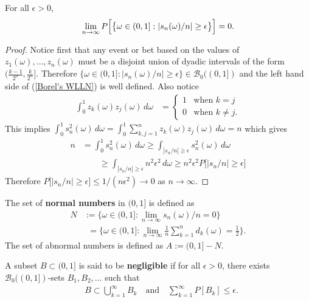 \begin{theorem}[{\bf WLLN}]
For all $\epsilon>0$,
\begin{equation}
\label{Borel's WLLN}
\lim_{n\rightarrow \infty}P\Bigl[\bigl\{\omega\in (0,1]: \left|{s_n(\omega)}/n \right|\geq\epsilon \bigr\} \Bigr] =0.
\end{equation}
\end{theorem}
\begin{proof}
Notice first that any event or bet based on the values of $z_1(\omega), \ldots, z_n(\omega)$ must be a disjoint union of dyadic intervals of the form $(\frac{k-1}{2^n}, \frac{k}{2^n}]$. Therefore $\bigl\{\omega\in (0,1]: \left|{s_n(\omega)}/n \right| \geq \epsilon \bigr\} \in \mathcal B_0((0,1])$ and the left hand side of (\ref{Borel's WLLN}) is well defined. Also notice
\begin{align*}
\int_0^1 z_k(\omega)z_j(\omega)\, d\omega
& = \begin{cases}
1 & \text{when $k=j$}\\
0 & \text{when $k\neq j$}.
\end{cases}
\end{align*}
This implies $\int_0^1 s^2_n(\omega)\, d\omega = \int_0^1 \sum_{k,j=1}^n z_k(\omega)z_j(\omega) \,d\omega = n$ which gives
\begin{align*}
n  &= \int_0^1 s^2_n(\omega)\, d\omega  \geq \int_{|s_n/n|\geq \epsilon} s^2_n(\omega)\, d\omega \\
& \qquad \geq \int_{|s_n/n|\geq \epsilon} n^2\epsilon^2\, d\omega  \geq n^2\epsilon^2 P\bigl[|s_n/n|\geq \epsilon\bigr]
\end{align*}
Therefore $P\bigl[|s_n/n|\geq \epsilon\bigr]\leq 1/(n\epsilon^2)\rightarrow 0$ as $n\rightarrow \infty$.
\end{proof}

\begin{definition}
The set of {\bf normal numbers} in $(0,1]$ is defined as
\begin{align*}
N
&:=\{\omega\in(0,1]: \lim_{n\rightarrow \infty} {s_n(\omega)}/n =0\}\\
&\phantom{:}=\{\omega\in(0,1]: \lim_{n\rightarrow \infty} \textstyle\frac{1}{n}\textstyle\sum_{k=1}^n d_k(\omega) = \textstyle\frac{1}{2}\}.
\end{align*}
The set of abnormal numbers is defined as $A:=(0,1]-N$.
\end{definition}


\begin{definition}
A subset $B\subset (0,1]$ is said to be {\bf negligible} if for all $\epsilon>0$, there exists $\mathcal B_0((0,1])$-sets $B_1, B_2,\ldots$ such that
\begin{align*}
&B\subset \bigcup_{k=1}^\infty B_k\quad\text{and}\quad\sum_{k=1}^\infty P[B_k]\leq \epsilon.
\end{align*}
\end{definition}

